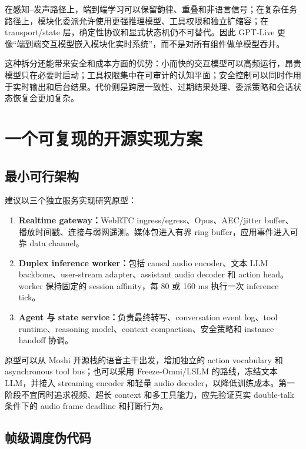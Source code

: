 \documentclass[UTF8,fontset=none,a4paper,10pt]{ctexart}
\begin{document}
在感知--发声路径上，端到端学习可以保留韵律、重叠和非语言信号；在复杂任务路径上，模块化委派允许使用更强推理模型、工具权限和独立扩缩容；在 transport/state 层，确定性协议和显式状态机仍不可替代。因此 GPT-Live 更像“端到端交互模型嵌入模块化实时系统”，而不是对所有组件做单模型吞并。

这种拆分还能带来安全和成本方面的优势：小而快的交互模型可以高频运行，昂贵模型只在必要时启动；工具权限集中在可审计的认知平面；安全控制可以同时作用于实时输出和后台结果。代价则是跨层一致性、过期结果处理、委派策略和会话状态恢复会更加复杂。

\section{一个可复现的开源实现方案}

\subsection{最小可行架构}

建议以三个独立服务实现研究原型：

\begin{enumerate}
  \item \textbf{Realtime gateway：}WebRTC ingress/egress、Opus、AEC/jitter buffer、播放时间戳、连接与弱网遥测。媒体包进入有界 ring buffer，应用事件进入可靠 data channel。
  \item \textbf{Duplex inference worker：}包括 causal audio encoder、文本 LLM backbone、user-stream adapter、assistant audio decoder 和 action head。worker 保持固定的 session affinity，每 80 或 160 ms 执行一次 inference tick。
  \item \textbf{Agent 与 state service：}负责最终转写、conversation event log、tool runtime、reasoning model、context compaction、安全策略和 instance handoff 协调。
\end{enumerate}

原型可以从 Moshi 开源栈的语音主干出发\cite{defossez2024moshi}，增加独立的 action vocabulary 和 asynchronous tool bus；也可以采用 Freeze-Omni/LSLM 的路线，冻结文本 LLM，并接入 streaming encoder 和轻量 audio decoder，以降低训练成本\cite{wang2024freezeomni,ma2025lslm}。第一阶段不宜同时追求视频、超长 context 和多工具能力，应先验证真实 double-talk 条件下的 audio frame deadline 和打断行为。

\subsection{帧级调度伪代码}
\end{document}
